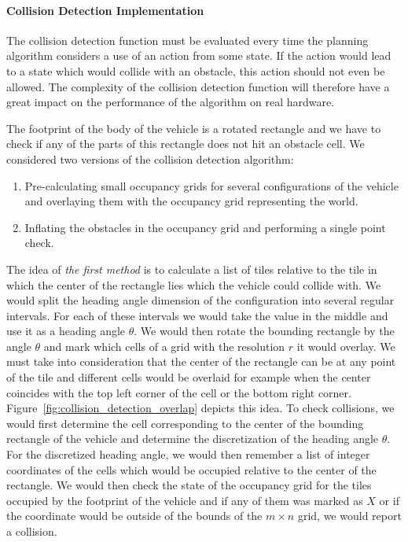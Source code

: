 \paragraph{Collision Detection Implementation}
The collision detection function must be evaluated every time the planning algorithm considers a use of an action from some state. If the action would lead to a state which would collide with an obstacle, this action should not even be allowed. The complexity of the collision detection function will therefore have a great impact on the performance of the algorithm on real hardware.

The footprint of the body of the vehicle is a rotated rectangle and we have to check if any of the parts of this rectangle does not hit an obstacle cell. We considered two versions of the collision detection algorithm:
\begin{enumerate}
	\item Pre-calculating small occupancy grids for several configurations of the vehicle and overlaying them with the occupancy grid representing the world.
	\item Inflating the obstacles in the occupancy grid and performing a single point check.
\end{enumerate}

The idea of \textit{the first method} is to calculate a list of tiles relative to the tile in which the center of the rectangle lies which the vehicle could collide with. We would split the heading angle dimension of the configuration into several regular intervals. For each of these intervals we would take the value in the middle and use it as a heading angle $\theta$. We would then rotate the bounding rectangle by the angle $\theta$ and mark which cells of a grid with the resolution $r$ it would overlay. We must take into consideration that the center of the rectangle can be at any point of the tile and different cells would be overlaid for example when the center coincides with the top left corner of the cell or the bottom right corner. Figure~\ref{fig:collision_detection_overlap} depicts this idea. To check collisions, we would first determine the cell corresponding to the center of the bounding rectangle of the vehicle and determine the discretization of the heading angle $\theta$. For the discretized heading angle, we would then remember a list of integer coordinates of the cells which would be occupied relative to the center of the rectangle. We would then check the state of the occupancy grid for the tiles occupied by the footprint of the vehicle and if any of them was marked as $X$ or if the coordinate would be outside of the bounds of the $m\times n$ grid, we would report a collision.

